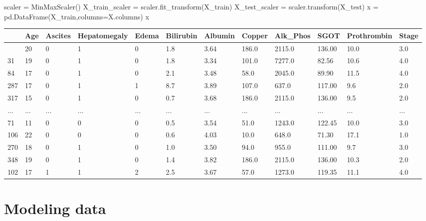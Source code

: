 \documentclass[
  letterpaper,
]{krantz}
\makeatletter
\newenvironment{Shaded}{\begin{snugshade}}{\end{snugshade}}
\newcommand{\NormalTok}[1]{\textcolor[rgb]{0.00,0.23,0.31}{#1}}
\newcommand{\OperatorTok}[1]{\textcolor[rgb]{0.37,0.37,0.37}{#1}}
\newenvironment{kframe}{%
\medskip{}
\setlength{\fboxsep}{.8em}
 \def\at@end@of@kframe{}%
 \ifinner\ifhmode%
  \def\at@end@of@kframe{\end{minipage}}%
  \begin{minipage}{\columnwidth}%
 \fi\fi%
 \def\FrameCommand##1{\hskip\@totalleftmargin \hskip-\fboxsep
 \colorbox{shadecolor}{##1}\hskip-\fboxsep
     \hskip-\linewidth \hskip-\@totalleftmargin \hskip\columnwidth}%
 \MakeFramed {\advance\hsize-\width
   \@totalleftmargin\z@ \linewidth\hsize
   \@setminipage}}%
 {\par\unskip\endMakeFramed%
 \at@end@of@kframe}
\renewenvironment{Shaded}{\begin{kframe}}{\end{kframe}}
\makeatother
\begin{document}
\begin{Shaded}
\begin{Highlighting}[]
\NormalTok{scaler }\OperatorTok{=}\NormalTok{ MinMaxScaler()}
\NormalTok{X\_train\_scaler }\OperatorTok{=}\NormalTok{ scaler.fit\_transform(X\_train)}
\NormalTok{X\_test\_scaler }\OperatorTok{=}\NormalTok{ scaler.transform(X\_test)}
\NormalTok{x }\OperatorTok{=}\NormalTok{ pd.DataFrame(X\_train,columns}\OperatorTok{=}\NormalTok{X.columns)}
\NormalTok{x}
\end{Highlighting}
\end{Shaded}

\begin{longtable}[]{@{}llllllllllll@{}}
\toprule\noalign{}
& Age & Ascites & Hepatomegaly & Edema & Bilirubin & Albumin & Copper &
Alk\_Phos & SGOT & Prothrombin & Stage \\
\midrule\noalign{}
\endhead
\bottomrule\noalign{}
\endlastfoot
336 & 20 & 0 & 1 & 0 & 1.8 & 3.64 & 186.0 & 2115.0 & 136.00 & 10.0 &
3.0 \\
31 & 19 & 0 & 1 & 0 & 1.8 & 3.34 & 101.0 & 7277.0 & 82.56 & 10.6 &
4.0 \\
84 & 17 & 0 & 1 & 0 & 2.1 & 3.48 & 58.0 & 2045.0 & 89.90 & 11.5 & 4.0 \\
287 & 17 & 0 & 1 & 1 & 8.7 & 3.89 & 107.0 & 637.0 & 117.00 & 9.6 &
2.0 \\
317 & 15 & 0 & 1 & 0 & 0.7 & 3.68 & 186.0 & 2115.0 & 136.00 & 9.5 &
2.0 \\
... & ... & ... & ... & ... & ... & ... & ... & ... & ... & ... & ... \\
71 & 11 & 0 & 0 & 0 & 0.5 & 3.54 & 51.0 & 1243.0 & 122.45 & 10.0 &
3.0 \\
106 & 22 & 0 & 0 & 0 & 0.6 & 4.03 & 10.0 & 648.0 & 71.30 & 17.1 & 1.0 \\
270 & 18 & 0 & 1 & 0 & 1.0 & 3.50 & 94.0 & 955.0 & 111.00 & 9.7 & 3.0 \\
348 & 19 & 0 & 1 & 0 & 1.4 & 3.82 & 186.0 & 2115.0 & 136.00 & 10.3 &
2.0 \\
102 & 17 & 1 & 1 & 2 & 2.5 & 3.67 & 57.0 & 1273.0 & 119.35 & 11.1 &
4.0 \\
\end{longtable}


\hypertarget{modeling-data-1}{%
\chapter{Modeling data}\label{modeling-data-1}}
\end{document}
